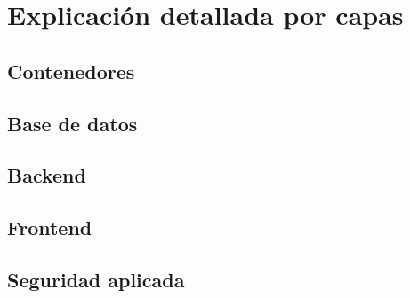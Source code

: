 \chapter{Explicaci\'on detallada por capas}
\section{Contenedores}
\section{Base de datos}
\section{Backend}
\section{Frontend}
\section{Seguridad aplicada}